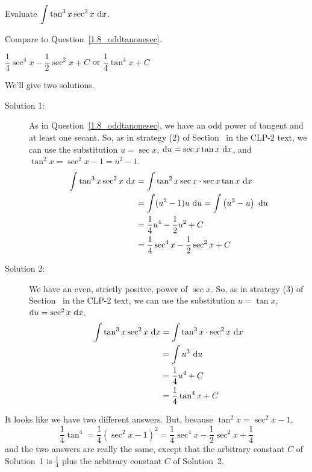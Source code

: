 \begin{question}\label{1.8_oddtanonesec2}
Evaluate $\displaystyle\int \tan^3x\sec^2x~\mathrm{d}x$.
\end{question}
\begin{hint}
Compare to Question~\ref{1.8_oddtanonesec}.
\end{hint}
\begin{answer}
$\dfrac{1}{4}\sec^4 x - \dfrac{1}{2}\sec^2 x +C$ or
$\dfrac{1}{4}\tan^4 x +C$
\end{answer}
\begin{solution}
We'll give two solutions.
\begin{description}
\item[Solution 1:]
As in Question~\ref{1.8_oddtanonesec}, we have an odd power of tangent and at least one secant. So, as in strategy (2) of Section~ in the CLP-2 text, we can use the substitution $u=\sec x$, $\mathrm{d}u=\sec x \tan x~\mathrm{d}x$, and $\tan^2 x = \sec^2 x -1=u^2-1$.
\begin{align*}
\int \tan^3x\sec^2x~\mathrm{d}x&=\int \tan^2 x \sec x \cdot \sec x \tan x~\mathrm{d}x\\
&=\int(u^2-1)u~\mathrm{d}u = \int \left(u^3-u\right)~\mathrm{d}u\\
&=\frac{1}{4}u^4 - \frac{1}{2}u^2+C\\
&=\frac{1}{4}\sec^4 x - \frac{1}{2}\sec^2 x +C
\end{align*}

\item[Solution 2:]
We have an even, strictly positve, power of $\sec x$. So, as in strategy (3) of Section~ in the CLP-2 text, we can use the substitution $u=\tan x$, $\mathrm{d}u=\sec^2 x~\mathrm{d}x$.
\begin{align*}
\int \tan^3x\sec^2x~\mathrm{d}x&=\int \tan^3 x \cdot \sec^2 x ~\mathrm{d}x\\
&=\int u^3~\mathrm{d}u \\
&=\frac{1}{4}u^4 + C\\
&=\frac{1}{4}\tan^4x +C
\end{align*}
\end{description}
It looks like we have two different answers. But, because $\tan^2x = \sec^2 x-1$,
 \begin{equation*}
 \frac{1}{4}\tan^4 = \frac{1}{4} {(\sec^2x -1)}^2
                   = \frac{1}{4} \sec^4 x - \frac{1}{2}\sec^2 x + \frac{1}{4}
 \end{equation*}
 and the two answers are really the same, except that the arbitrary constant $C$ of Solution~1 is 
 $\frac{1}{4}$ plus the arbitrary constant $C$ of Solution~2.  
\end{solution}

